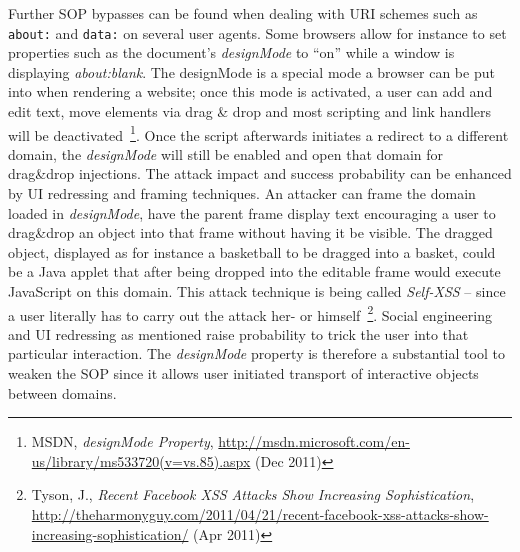     Further SOP bypasses can be found when dealing with URI schemes such as \texttt{about:} and \texttt{data:} on several user agents. Some browsers allow for instance to set properties such as the document's \textit{designMode} to ``on'' while a window is displaying \textit{about:blank}. The designMode is a special mode a browser can be put into when rendering a website; once this mode is activated, a user can add and edit text, move elements via drag \& drop and most scripting and link handlers will be deactivated~\footnote{MSDN, \textit{designMode Property}, \url{http://msdn.microsoft.com/en-us/library/ms533720(v=vs.85).aspx} (Dec 2011)}. Once the script afterwards initiates a redirect to a different domain, the \textit{designMode} will still be enabled and open that domain for drag\&drop injections. The attack impact and success probability can be enhanced by UI redressing and framing techniques. An attacker can frame the domain loaded in \textit{designMode}, have the parent frame display text 
encouraging a user to drag\&drop an object into that frame without having it be visible. The dragged object, displayed as for instance a basketball to be dragged into a basket, could be a Java applet that after being dropped into the editable frame would execute JavaScript on this domain. This attack technique is being called \textit{Self-XSS} -- since a user literally has to carry out the attack her- or himself~\footnote{Tyson, J., \textit{Recent Facebook XSS Attacks Show Increasing Sophistication}, \url{http://theharmonyguy.com/2011/04/21/recent-facebook-xss-attacks-show-increasing-sophistication/} (Apr 2011)}. Social engineering and UI redressing as mentioned raise probability to trick the user into that particular interaction. The \textit{designMode} property is therefore a substantial tool to weaken the SOP since it allows user initiated transport of interactive objects between domains.\\

